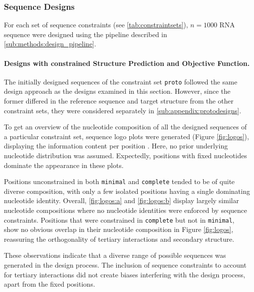 \documentclass[../../master.tex]{subfiles}
\begin{document}
\subsubsection{Sequence Designs}
\label{ssub:results:designs}

For each set of sequence constraints (see \autoref{tab:constraintsets}), $n = 1000$ RNA sequence were designed using the pipeline described in \autoref{sub:methods:design_pipeline}.



\paragraph{Designs with constrained Structure Prediction and Objective Function.}
\label{par:results:constrained_ned}

The initially designed sequences of the constraint set \texttt{proto} followed the same design approach as the designs examined in this section.
However, since the former differed in the reference sequence and target structure from the other constraint sets, they were considered separately in \autoref{sub:appendix:protodesigns}.

To get an overview of the nucleotide composition of all the designed sequences of a particular constraint set, sequence logo plots were generated (Figure \ref{fig:logos}), displaying the information content per position \parencite{schneider_information_1986}. 
Here, no prior underlying nucleotide distribution was assumed.
Expectedly, positions with fixed nucleotides dominate the appearance in these plots.

Positions unconstrained in both \texttt{minimal} and \texttt{complete} tended to be of quite diverse composition, with only a few isolated positions having a single dominating nucleotide identity. 
Overall, \autoref{fig:logos:a} and \ref{fig:logos:b} display largely similar nucleotide compositions where no nucleotide identities were enforced by sequence constraints.
Positions that were constrained in \texttt{complete} but not in \texttt{minimal}, show no obvious overlap in their nucleotide composition in Figure \ref{fig:logos}, reassuring the orthogonality of tertiary interactions and secondary structure.

These observations indicate that a diverse range of possible sequences was generated in the design process. 
The inclusion of sequence constraints to account for tertiary interactions did not create biases interfering with the design process, apart from the fixed positions.
\end{document}
